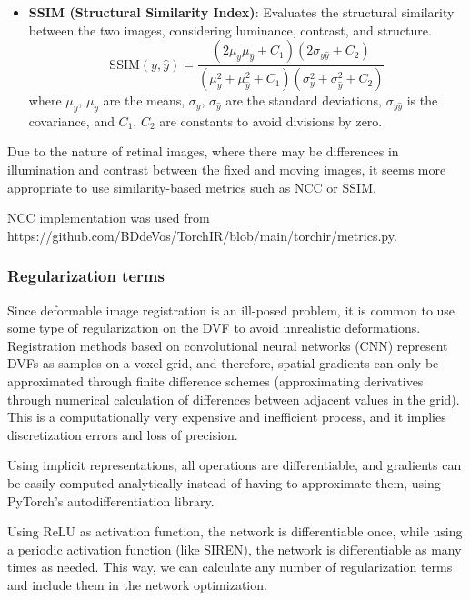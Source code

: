 \begin{itemize}
    \item \textbf{SSIM (Structural Similarity Index)}:
    Evaluates the structural similarity between the two images, considering luminance, contrast, and structure.
    \[
    \text{SSIM}(y, \hat{y}) = \frac{(2\mu_y\mu_{\hat{y}} + C_1)(2\sigma_{y\hat{y}} + C_2)}{(\mu_y^2 + \mu_{\hat{y}}^2 + C_1)(\sigma_y^2 + \sigma_{\hat{y}}^2 + C_2)}
    \]
    where \( \mu_y \), \( \mu_{\hat{y}} \) are the means, \( \sigma_y \), \( \sigma_{\hat{y}} \) are the standard deviations, \( \sigma_{y\hat{y}} \) is the covariance, and \( C_1 \), \( C_2 \) are constants to avoid divisions by zero. \cite{Palubinskas02012017}
\end{itemize}

Due to the nature of retinal images, where there may be differences in illumination and contrast between the fixed and moving images,
it seems more appropriate to use similarity-based metrics such as NCC or SSIM.

NCC implementation was used from https://github.com/BDdeVos/TorchIR/blob/main/torchir/metrics.py.

\subsubsection{Regularization terms}\label{subsubsec:Regularization terms}

Since deformable image registration is an ill-posed problem, it is common to use some type of regularization on the DVF to avoid unrealistic deformations. Registration methods based on convolutional neural networks (CNN) represent DVFs as samples on a voxel grid, and therefore, spatial gradients can only be approximated through finite difference schemes (approximating derivatives through numerical calculation of differences between adjacent values in the grid). This is a computationally very expensive and inefficient process, and it implies discretization errors and loss of precision.

Using implicit representations, all operations are differentiable, and gradients can be easily computed analytically instead of having to approximate them, using PyTorch's autodifferentiation library.

Using ReLU as activation function, the network is differentiable once, while using a periodic activation function (like SIREN), the network is differentiable as many times as needed. This way, we can calculate any number of regularization terms and include them in the network optimization.

